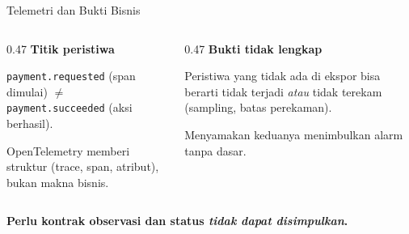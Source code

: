 \documentclass[11pt,aspectratio=169,t]{beamer}
\begin{document}
\begin{frame}{Telemetri dan Bukti Bisnis}
\small
\begin{columns}[T,onlytextwidth]
\begin{column}{0.47\textwidth}
\textbf{Titik peristiwa}
\medskip

\texttt{payment.requested} (span dimulai) $\neq$ \texttt{payment.succeeded} (aksi berhasil).
\medskip

OpenTelemetry memberi struktur (trace, span, atribut), bukan makna bisnis.
\end{column}
\begin{column}{0.47\textwidth}
\textbf{Bukti tidak lengkap}
\medskip

Peristiwa yang tidak ada di ekspor bisa berarti tidak terjadi \emph{atau} tidak terekam (sampling, batas perekaman).
\medskip

Menyamakan keduanya menimbulkan alarm tanpa dasar.
\end{column}
\end{columns}
\vfill
\begin{center}
\normalsize\textbf{Perlu kontrak observasi dan status \emph{tidak dapat disimpulkan}.}
\end{center}
\vspace{0.4cm}
\end{frame}
\end{document}

